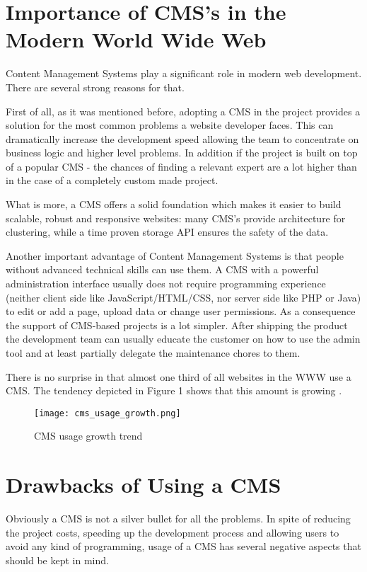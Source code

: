 \section{Importance of CMS's in the Modern World Wide Web}
Content Management Systems play a significant role in modern web development.
There are several strong reasons for that.

First of all, as it was mentioned before, adopting a CMS in the project provides
a solution for the most common problems a website developer faces. This can
dramatically increase the development speed allowing the team to concentrate on
business logic and higher level problems. In addition if the project is built on
top of a popular CMS - the chances of finding a relevant expert are a lot higher
than in the case of a completely custom made project.

What is more, a CMS offers a solid foundation which makes it easier to build
scalable, robust and responsive websites: many CMS's provide architecture for
clustering, while a time proven storage API ensures the safety of the data.

Another important advantage of Content Management Systems is that people without
advanced technical skills can use them.
A CMS with a powerful administration interface usually does not require
programming experience (neither client side like JavaScript/HTML/CSS, nor server
side like PHP or Java) to edit or add a page, upload data or change user
permissions. As a consequence the support of CMS-based projects is a lot
simpler. After shipping the product the development team can usually educate the
customer on how to use the admin tool and at least partially delegate the
maintenance chores to them.

There is no surprise in that almost one third of all websites in the WWW use a
CMS. The tendency depicted in Figure 1 shows that this amount is growing
\cite{cms_growth}.
\begin{figure}[H]
	\centering
	\texttt{[image: cms\_usage\_growth.png]}
	\caption{CMS usage growth trend}
	\label{fig:cms_usage_growth}
\end{figure}

\section{Drawbacks of Using a CMS}
Obviously a CMS is not a silver bullet for all the problems. In spite of
reducing the project costs, speeding up the development process and allowing
users to avoid any kind of programming, usage of a CMS has several negative
aspects that should be kept in mind.

